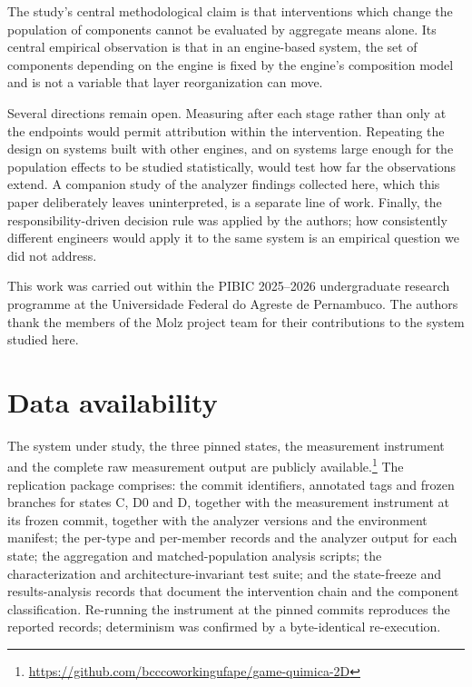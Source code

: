 \documentclass{sbc2019}%
\begin{document}
The study's central methodological claim is that interventions which change the
population of components cannot be evaluated by aggregate means alone. Its
central empirical observation is that in an engine-based system, the set of
components depending on the engine is fixed by the engine's composition model
and is not a variable that layer reorganization can move.

Several directions remain open. Measuring after each stage rather than only at
the endpoints would permit attribution within the intervention. Repeating the
design on systems built with other engines, and on systems large enough for the
population effects to be studied statistically, would test how far the
observations extend. A companion study of the analyzer findings collected here,
which this paper deliberately leaves uninterpreted, is a separate line of work.
Finally, the responsibility-driven decision rule was applied by the authors; how
consistently different engineers would apply it to the same system is an
empirical question we did not address.

\begin{acknowledgements}
This work was carried out within the PIBIC 2025--2026 undergraduate research
programme at the Universidade Federal do Agreste de Pernambuco. The authors
thank the members of the Molz project team for their contributions to the
system studied here.
\end{acknowledgements}

\section*{Data availability}

The system under study, the three pinned states, the measurement instrument and
the complete raw measurement output are publicly
available.\footnote{\url{https://github.com/bcccoworkingufape/game-quimica-2D}}
The replication package comprises: the commit identifiers, annotated tags and
frozen branches for states C, D0 and D, together with the measurement instrument at its frozen
commit, together with the analyzer versions and the environment manifest; the
per-type and per-member records and the analyzer output for each state; the
aggregation and matched-population analysis scripts; the characterization and
architecture-invariant test suite; and the state-freeze and results-analysis
records that document the intervention chain and the component classification.
Re-running the instrument at the pinned commits reproduces the reported records;
determinism was confirmed by a byte-identical re-execution.
\end{document}
